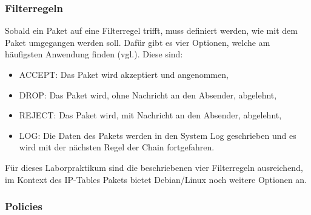 \documentclass[
a4paper,     %
 headsepline, %
footsepline, %
titlepage,   %
 halfparskip,     %
 fleqn,       %
12pt         %
]{scrartcl}  %
\begin{document}
\begin{table}[!h]
\centering
{}
\caption{IP-Tables: Chains}
\label{IP-Tables: Chains}
\end{table}

\subsubsection{Filterregeln}
Sobald ein Paket auf eine Filterregel trifft, muss definiert werden, wie mit dem Paket umgegangen werden soll. Dafür gibt es vier Optionen, welche am häufigsten Anwendung finden (vgl.\cite{iptables-1}). Diese sind:
\begin{itemize}

\item ACCEPT: Das Paket wird akzeptiert und angenommen,
\item DROP: Das Paket wird, ohne Nachricht an den Absender, abgelehnt,
\item REJECT: Das Paket wird, mit Nachricht an den Absender, abgelehnt,
\item LOG: Die Daten des Pakets werden in den System Log geschrieben und es wird mit der nächsten Regel der Chain fortgefahren. 

\end{itemize}

Für dieses Laborpraktikum sind die beschriebenen vier Filterregeln ausreichend, im Kontext des IP-Tables Pakets bietet Debian/Linux noch weitere Optionen an. 
 
\subsubsection{Policies}
\end{document}
